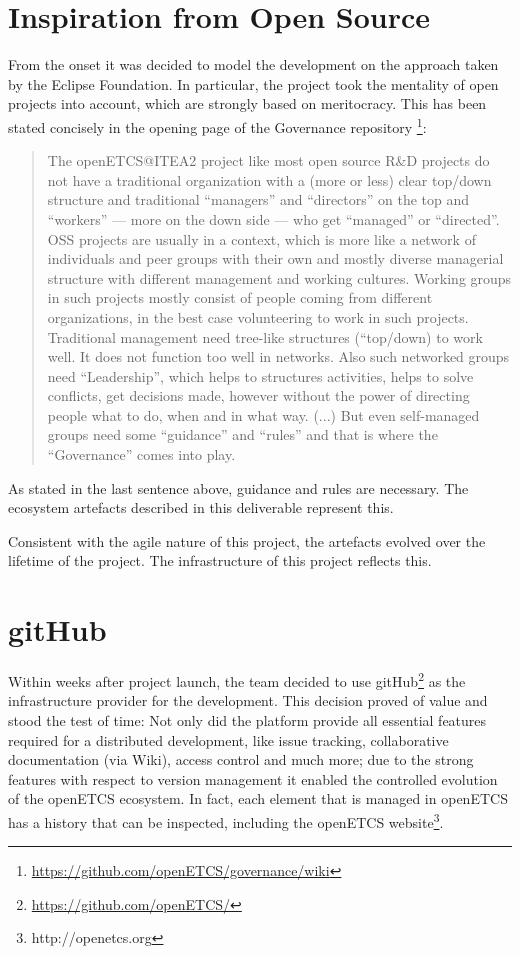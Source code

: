 \documentclass{template/openetcs_report}
\begin{document}
\section{Inspiration from Open Source}

From the onset it was decided to model the development on the approach taken by the
Eclipse Foundation. In particular, the project took the mentality of open projects into account, which are strongly based on meritocracy.  This has been stated concisely in the opening page of the Governance repository \footnote{\url{https://github.com/openETCS/governance/wiki}}:

\begin{quote}
The openETCS@ITEA2 project like most open source R\&D projects do not have a traditional organization with a (more or less) clear top/down structure and traditional ``managers'' and ``directors'' on the top and ``workers'' --- more on the down side --- who get ``managed'' or ``directed''. OSS projects are usually in a context, which is more like a network of individuals and peer groups with their own and mostly diverse managerial structure with different management and working cultures. Working groups in such projects mostly consist of people coming from different organizations, in the best case volunteering to work in such projects. Traditional management need tree-like structures (``top/down) to work well. It does not function too well in networks. Also such networked groups need “Leadership”, which helps to structures activities, helps to solve conflicts, get decisions made, however without the power of directing people what to do, when and in what way. (...) But even self-managed groups need some ``guidance'' and ``rules'' and that is where the ``Governance'' comes into play.
\end{quote}

As stated in the last sentence above, guidance and rules are necessary.  The ecosystem artefacts described in this deliverable represent this.

Consistent with the agile nature of this project, the artefacts evolved over the lifetime of the project. The infrastructure of this project reflects this.

\section{gitHub}

Within weeks after project launch, the team decided to use gitHub\footnote{\url{https://github.com/openETCS/}} as the infrastructure provider for the development.  This decision proved of value and stood the test of time: Not only did the platform provide all essential features required for a distributed development, like issue tracking, collaborative documentation (via Wiki), access control and much more; due to the strong features with respect to version management it enabled the controlled evolution of the openETCS ecosystem.  In fact, each element that is managed in openETCS has a history that can be inspected, including the openETCS website\footnote{http://openetcs.org}.
\end{document}
